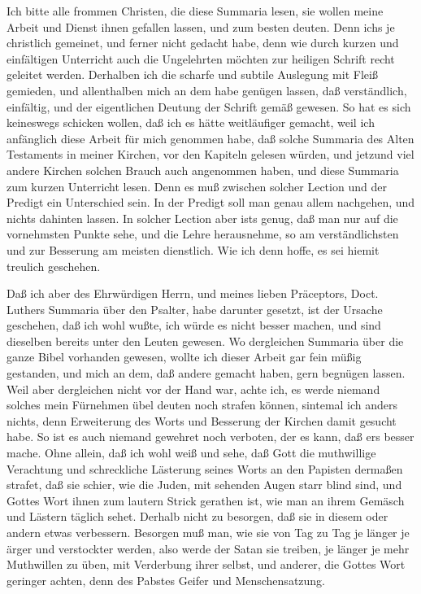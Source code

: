 Ich bitte alle frommen Christen, die diese Summaria lesen, sie wollen meine Arbeit und Dienst ihnen gefallen lassen, und zum besten deuten. Denn ichs je christlich gemeinet, und ferner nicht gedacht habe, denn wie durch kurzen und einfältigen Unterricht auch die Ungelehrten möchten zur heiligen Schrift recht geleitet werden. Derhalben ich die scharfe und subtile Auslegung mit Fleiß gemieden, und allenthalben mich an dem habe genügen lassen, daß verständlich, einfältig, und der eigentlichen Deutung der Schrift gemäß gewesen. So hat es sich keineswegs schicken wollen, daß ich es hätte weitläufiger gemacht, weil ich anfänglich diese Arbeit für mich genommen habe, daß solche Summaria des Alten Testaments in meiner Kirchen, vor den Kapiteln gelesen würden, und jetzund viel andere Kirchen solchen Brauch auch angenommen haben, und diese Summaria zum kurzen Unterricht lesen. Denn es muß zwischen solcher Lection und der Predigt ein Unterschied sein. In der Predigt soll man genau allem nachgehen, und nichts dahinten lassen. In solcher Lection aber ists genug, daß man nur auf die vornehmsten Punkte sehe, und die Lehre herausnehme, so am verständlichsten und zur Besserung am meisten dienstlich. Wie ich denn hoffe, es sei hiemit treulich geschehen.

Daß ich aber des Ehrwürdigen Herrn, und meines lieben Präceptors, Doct. Luthers Summaria über den Psalter, habe darunter gesetzt, ist der Ursache geschehen, daß ich wohl wußte, ich würde es nicht besser machen, und sind dieselben bereits unter den Leuten gewesen. Wo dergleichen Summaria über die ganze Bibel vorhanden gewesen, wollte ich dieser Arbeit gar fein müßig gestanden, und mich an dem, daß andere gemacht haben, gern begnügen lassen. Weil aber dergleichen nicht vor der Hand war, achte ich, es werde niemand solches mein Fürnehmen übel deuten noch strafen können, sintemal ich anders nichts, denn Erweiterung des Worts und Besserung der Kirchen damit gesucht habe. So ist es auch niemand gewehret noch verboten, der es kann, daß ers besser mache. Ohne allein, daß ich wohl weiß und sehe, daß Gott die muthwillige Verachtung und schreckliche Lästerung seines Worts an den Papisten dermaßen strafet, daß sie schier, wie die Juden, mit sehenden Augen starr blind sind, und Gottes Wort ihnen zum lautern Strick gerathen ist, wie man an ihrem Gemäsch und Lästern täglich sehet. Derhalb nicht zu besorgen, daß sie in diesem oder andern etwas verbessern. Besorgen muß man, wie sie von Tag zu Tag je länger je ärger und verstockter werden, also werde der Satan sie treiben, je länger je mehr Muthwillen zu üben, mit Verderbung ihrer selbst, und anderer, die Gottes Wort geringer achten, denn des Pabstes Geifer und Menschensatzung.

